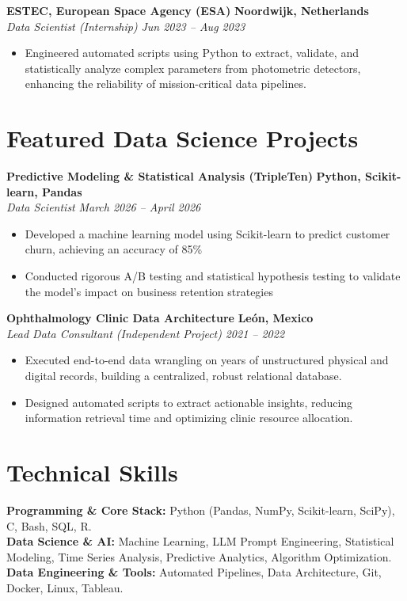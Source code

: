 \documentclass[10pt,a4paper]{article}
\begin{document}
\textbf{ESTEC, European Space Agency (ESA)} \hfill \textbf{Noordwijk, Netherlands}\\
\textit{Data Scientist (Internship)}  \hfill \textit{Jun 2023 -- Aug 2023}
\begin{itemize}[leftmargin=1.5em]
    \item Engineered automated scripts using Python to extract, validate, and statistically analyze complex parameters from photometric detectors, enhancing the reliability of mission-critical data pipelines.
\end{itemize}

\section*{Featured Data Science Projects}
\textbf{Predictive Modeling \& Statistical Analysis (TripleTen)} \hfill \textbf{Python, Scikit-learn, Pandas} \\
\textit{Data Scientist} \hfill \textit{March 2026 -- April 2026}
\begin{itemize}[leftmargin=1.5em]
    \item Developed a machine learning model using Scikit-learn to predict customer churn, achieving an accuracy of 85\%
    \item Conducted rigorous A/B testing and statistical hypothesis testing to validate the model's impact on business retention strategies
\end{itemize}

\textbf{Ophthalmology Clinic Data Architecture} \hfill \textbf{León, Mexico} \\
\textit{Lead Data Consultant (Independent Project)} \hfill \textit{2021 -- 2022}
\begin{itemize}[leftmargin=1.5em]
    \item Executed end-to-end data wrangling on years of unstructured physical and digital records, building a centralized, robust relational database.
    \item Designed automated scripts to extract actionable insights, reducing information retrieval time and optimizing clinic resource allocation.
\end{itemize}

\section*{Technical Skills}
\textbf{Programming \& Core Stack:} Python (Pandas, NumPy, Scikit-learn, SciPy), C, Bash, SQL, R. \\
\textbf{Data Science \& AI:} Machine Learning, LLM Prompt Engineering, Statistical Modeling, Time Series Analysis, Predictive Analytics, Algorithm Optimization. \\
\textbf{Data Engineering \& Tools:} Automated Pipelines, Data Architecture, Git, Docker, Linux, Tableau.
\end{document}
